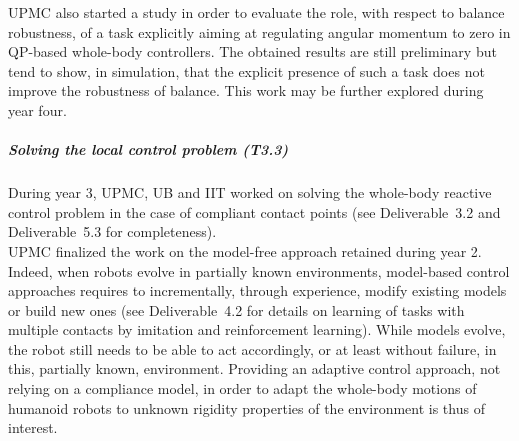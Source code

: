 UPMC also started a study in order to evaluate the role, with respect to balance robustness, of a task explicitly aiming at regulating angular momentum to zero in QP-based whole-body controllers. The obtained results are still preliminary but  tend to show, in simulation, that the explicit presence of such a task does not improve the robustness of balance. This work may be further explored during year four.

\subparagraph*{Solving the local control problem (T3.3)}

During year 3, UPMC, UB and IIT worked on solving the whole-body reactive control problem in the case of compliant contact points (see Deliverable~3.2 \cite{deliverable32} and Deliverable~5.3 \cite{deliverable53} for completeness).\\

UPMC finalized the work on the model-free approach retained during year 2. Indeed, when robots evolve in partially known environments, model-based control approaches requires to incrementally, through experience, modify existing models or build new ones (see Deliverable~4.2 \cite{deliverable42} for details on learning of tasks with multiple contacts by imitation and reinforcement learning). While models evolve, the robot still needs to be able to act accordingly, or at least without failure, in this, partially known, environment. Providing an adaptive control approach, not relying on a compliance model, in order to adapt the whole-body motions of humanoid robots to unknown rigidity properties of the environment is thus of interest.

